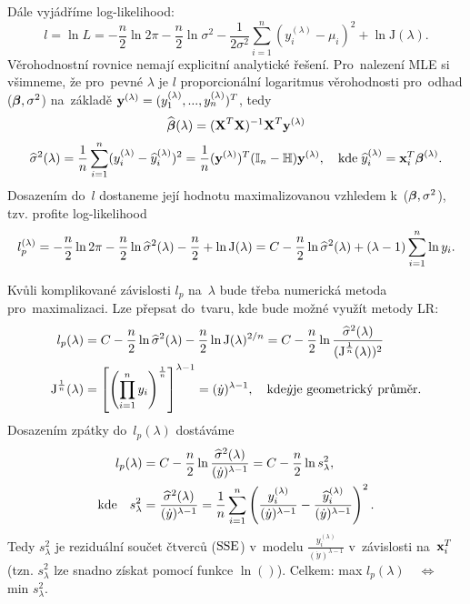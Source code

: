 Dále vyjádříme log-likelihood:
 $$
 l = \ln L = -\frac{n}{2}\ln 2 \pi - \frac{n}{2}\ln \sigma^2 - \frac{1}{2 \sigma^2} \sum_{i = 1}^n (y_i^{(\lambda)} - \mu_i)^2 + \ln\text{J}(\lambda).
 $$
Věrohodnostní rovnice nemají explicitní analytické řešení. Pro~nalezení MLE si všimneme, že pro~pevné $\lambda$ je $l$ proporcionální logaritmus věrohodnosti pro~odhad ($\boldsymbol{\beta}, \sigma^2$) na~základě $\textbf{y}^{(\lambda)} = (y_1^{(\lambda)},..., y_n^{(\lambda)})^T$, tedy
 $$
 \widehat{\boldsymbol{\beta}} (\lambda) = {(\textbf{X}^T\textbf{X})^{-1}} \textbf{X}^T \textbf{y}^{(\lambda)}
 $$
 $$
 \widehat{\sigma}^2 (\lambda) = \frac{1}{n} \sum_{i = 1}^n (y_i^{(\lambda)} - \widehat{y} _i^{(\lambda)})^2 = \frac{1}{n} (\textbf{y}^{(\lambda)})^T (\mathbb{I} _n - \mathbb{H}) \textbf{y}^{(\lambda)}, \quad \text{kde} \; \widehat{y}_i^{(\lambda)} = \textbf{x}_i^T \boldsymbol{\beta}^{(\lambda)}.
 $$
Dosazením do~$l$ dostaneme její hodnotu maximalizovanou vzhledem k~($\boldsymbol{\beta}, \sigma^2$), tzv. profite log-likelihood
 $$
  l_p^{(\lambda)} = -\frac{n}{2} \ln 2 \pi - \frac{n}{2} \ln \widehat{\sigma}^2 (\lambda) - \frac{n}{2} + \ln \text{J}(\lambda)
 = C - \frac{n}{2} \ln \widehat{\sigma}^2 (\lambda) + (\lambda - 1)  \sum_{i = 1}^n \ln y_i.
 $$
\begin{remark}
Kvůli komplikované závislosti $l_p$ na~$\lambda$ bude třeba numerická metoda pro~maximalizaci. Lze přepsat do~tvaru, kde bude možné využít metody LR:
\begin{align*}
 l_p (\lambda) & = C - \frac{n}{2} \ln \widehat{\sigma}^2 (\lambda)  - \frac{n}{2} \ln\text{J}(\lambda)^{2/n} = C - \frac{n}{2} \ln \frac{ \widehat{\sigma}^2 (\lambda)}{(\text{J}^{\frac{1}{n}}(\lambda))^2} \\
 \text{J}^{\frac{1}{n}}(\lambda) & = \left[\left(\prod_{i = 1}^n y_i \right)^{\frac{1}{n}} \right]^{\lambda - 1} = (\dot{y})^{\lambda - 1}, \quad \text{kde} \dot{y} \text{je geometrický průměr.}
\end{align*}
Dosazením zpátky do~$l_p(\lambda)$ dostáváme
\begin{align*}
\quad  l_p(\lambda) & = C - \frac{n}{2} \ln \frac{ \widehat{\sigma}^2 (\lambda)}{(\dot{y})^{\lambda - 1}} = C - \frac{n}{2}\ln s_{\lambda}^2, \\
\text{kde} \quad s_{\lambda}^2 & = \frac{ \widehat{\sigma}^2 (\lambda)}{(\dot{y})^{\lambda - 1}} = \frac{1}{n} \sum_{i = 1}^n \left(\frac{y_i^{(\lambda)}}{(\dot{y})^{\lambda-1}} - \frac{\widehat{y}_i^{(\lambda)}}{(\dot{y})^{\lambda-1}} \right)^2.
\end{align*}
Tedy $s_{\lambda}^2$ je reziduální součet čtverců ($\mathrm{SSE}$) v~modelu $\frac{y_i^{(\lambda)}}{(\dot{y})^{\lambda-1}}$ v~závislosti na~$\textbf{x}_i^T$ (tzn. $s_{\lambda}^2$ lze snadno získat pomocí funkce $\ln()$). Celkem: max $l_p(\lambda) \quad \Leftrightarrow \quad$ min $s_{\lambda}^2$.
\end{remark}

